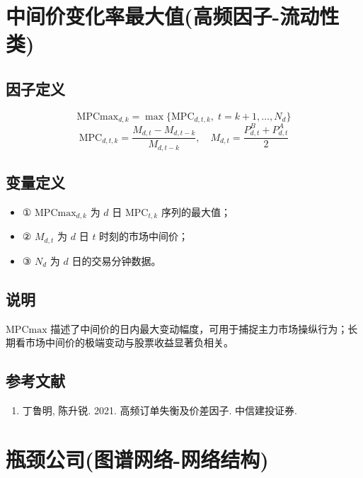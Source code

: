 \documentclass{article}
\begin{document}
\section{中间价变化率最大值(高频因子-流动性类)}

\subsection{因子定义}

\begin{equation}
    \mathrm{MPCmax}_{d,k} = \max \{ \mathrm{MPC}_{d,t,k}, \; t = k+1, \ldots, N_d \}
\end{equation}
\begin{equation}
    \mathrm{MPC}_{d,t,k} = \frac{M_{d,t} - M_{d,t-k}}{M_{d,t-k}}, \quad M_{d,t} = \frac{P_{d,t}^B + P_{d,t}^A}{2}
\end{equation}

\subsection{变量定义}
\begin{itemize}
    \item ① \( \mathrm{MPCmax}_{d,k} \) 为 \( d \) 日 \( \mathrm{MPC}_{t,k} \) 序列的最大值；
    \item ② \( M_{d,t} \) 为 \( d \) 日 \( t \) 时刻的市场中间价；
    \item ③ \( N_d \) 为 \( d \) 日的交易分钟数据。
\end{itemize}

\subsection{说明}
\( \mathrm{MPCmax} \) 描述了中间价的日内最大变动幅度，可用于捕捉主力市场操纵行为；长期看市场中间价的极端变动与股票收益显著负相关。

\subsection{参考文献}
\begin{enumerate}
    \item 丁鲁明, 陈升锐. 2021. 高频订单失衡及价差因子. 中信建投证券.
\end{enumerate}

\section{瓶颈公司(图谱网络-网络结构)}
\end{document}

